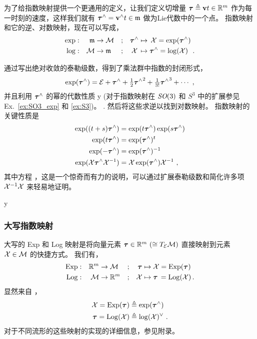 为了给指数映射提供一个更通用的定义，让我们定义切增量 ${\bm \tau}\triangleq{\bf v} t\in{\mathbb R}^m$ 作为每一时刻的速度，这样我们就有 ${\bm \tau}^\wedge={\bf v}^\wedge t\in\frak{m}$ 做为Lie代数中的一个点。
指数映射和它的逆、对数映射，现在可以写成，
%
\begin{align}
\exp &:& \frak{m} & \to\mathcal{M}      
 &&; & {\bm \tau}^\wedge &\mapsto \,\mathcal{X} = \exp({\bm \tau}^\wedge) 
 \\
\log &:&     \mathcal{M} & \to\frak{m} 
 &&; & \mathcal{X}\,    &\mapsto {\bm \tau}^\wedge = \log(\mathcal{X}) ~
~. 
\end{align}


通过写出绝对收敛的泰勒级数，得到了乘法群中指数的封闭形式，
%
\begin{align}
\exp({\bm \tau}^\wedge)=\mathcal{E}+{\bm \tau}^\wedge+\tfrac12{{\bm \tau}^\wedge}^2+\tfrac1{3!}{{\bm \tau}^\wedge}^3+\cdots
~,
\end{align}
%
并且利用 ${\bm \tau}^\wedge$ 的幂的代数性质%
\if \examples y (对于指数映射在 $\textit{SO}(3)$ 和 $S^3$ 中的扩展参见 Ex.~\ref{ex:SO3_exp} 和 \ref{ex:S3})。 \else. \fi
然后将这些求逆以找到对数映射。
%
指数映射的关键性质是 
%
\begin{align}
\exp((t+s){\bm \tau}^\wedge) 
 &= \exp(t{\bm \tau}^\wedge)\exp(s{\bm \tau}^\wedge) \label{equ:prop_exp_ts}
 \\
\exp(t{\bm \tau}^\wedge) 
 &= \exp({\bm \tau}^\wedge)^t \label{equ:prop_exp_t}
 \\
\exp(-{\bm \tau}^\wedge) 
 &= \exp({\bm \tau}^\wedge)^{-1} \label{equ:prop_exp_inv}
 \\
\exp(\mathcal{X}{\bm \tau}^\wedge\mathcal{X}^{-1}) 
 &= \mathcal{X}\exp({\bm \tau}^\wedge)\mathcal{X}^{-1} ~, \label{equ:prop_exp}
\end{align} 
%
其中方程 ，这是一个惊奇而有力的说明，可以通过扩展泰勒级数和简化许多项 $\mathcal{X}^{-1}\mathcal{X}$ 来轻易地证明。

\if\examples y

\fi



\subsubsection[The capitalized Exp map]{大写指数映射}


大写的 Exp 和 Log 映射是将向量元素 ${\bm \tau}\in{\mathbb R}^m~(\cong T_{\mathcal{E}}{\mathcal{M}})$ 直接映射到元素 $\mathcal{X}\in\mathcal{M}$ 的快捷方式。
% 
我们有，
%
\begin{align}
\operatorname*{Exp} &: &{\mathbb R}^m &\to\mathcal{M} &&;&
\,{\bm \tau} &\mapsto \mathcal{X} = \operatorname*{Exp}({\bm \tau})\\
\operatorname*{Log}  &: & \mathcal{M} &\to{\mathbb R}^m &&;&
 \mathcal{X} &\mapsto {\bm \tau}\,=\operatorname*{Log}(\mathcal{X}) 
\,. 
\end{align}
%
显然来自 ，
%
\begin{align}
\mathcal{X}  = \operatorname*{Exp}({\bm \tau}) &\triangleq \exp({\bm \tau}^\wedge) \\
{\bm \tau} =\operatorname*{Log}(\mathcal{X})    &\triangleq \log(\mathcal{X})^\vee 
~. 
\end{align}
%
对于不同流形的这些映射的实现的详细信息，参见附录。


